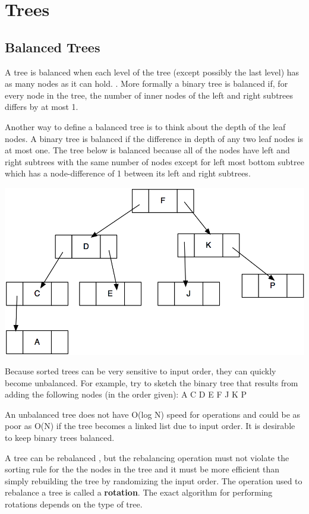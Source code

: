 \chapter{Trees} \label{tree}

\section{Balanced Trees}

A tree is balanced when each level of the tree (except possibly the last
level) has as many nodes as it can hold. .   More formally a binary tree is balanced if, for every node in the tree,  the number of inner nodes of the left and right subtrees differs by at most 1.

Another way to define a balanced tree is to think about the depth of the  leaf nodes.   A binary tree is balanced if the difference in depth of any two leaf nodes is at most one.
The tree below is balanced
because all of the nodes have  left and right subtrees  with the same number of nodes except for
left most bottom subtree which has a node-difference of 1 between its left and right subtrees.


\includegraphics{pictures/image6.png}

Because sorted trees can be very sensitive to input order, they can quickly
become unbalanced.  For example,  try to sketch the binary tree that results from adding the
following nodes (in the order given): A C D E F J K P    

An unbalanced tree does not have O(log N) speed for operations and could be as poor as O(N) if the tree becomes a linked list due to input order.  It is desirable to keep binary trees balanced.

A tree can be rebalanced , but the rebalancing operation must not violate the sorting rule for the
 the nodes in the tree and it must be more efficient than
simply rebuilding the tree by randomizing the input order. The operation
used to rebalance a tree is called a \textbf{rotation}.   The exact algorithm for performing rotations depends on the type of tree.

